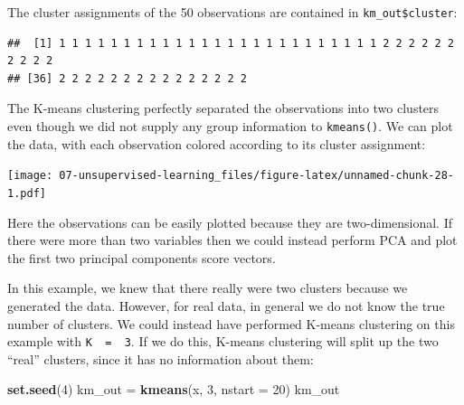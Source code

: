 \documentclass[openany]{book}
\newenvironment{Shaded}{\begin{snugshade}}{\end{snugshade}}
\newcommand{\DataTypeTok}[1]{\textcolor[rgb]{0.13,0.29,0.53}{#1}}
\newcommand{\DecValTok}[1]{\textcolor[rgb]{0.00,0.00,0.81}{#1}}
\newcommand{\KeywordTok}[1]{\textcolor[rgb]{0.13,0.29,0.53}{\textbf{#1}}}
\newcommand{\NormalTok}[1]{#1}
\newcommand{\OperatorTok}[1]{\textcolor[rgb]{0.81,0.36,0.00}{\textbf{#1}}}
\newcommand{\StringTok}[1]{\textcolor[rgb]{0.31,0.60,0.02}{#1}}
\begin{document}
The cluster assignments of the 50 observations are contained in
\texttt{km\_out\$cluster}:

\begin{Shaded}
\end{Shaded}

\begin{verbatim}
##  [1] 1 1 1 1 1 1 1 1 1 1 1 1 1 1 1 1 1 1 1 1 1 1 1 1 1 2 2 2 2 2 2 2 2 2 2
## [36] 2 2 2 2 2 2 2 2 2 2 2 2 2 2 2
\end{verbatim}

The K-means clustering perfectly separated the observations into two clusters
even though we did not supply any group information to \texttt{kmeans()}. We
can plot the data, with each observation colored according to its cluster
assignment:

\begin{Shaded}
\end{Shaded}

\texttt{[image: 07-unsupervised-learning\_files/figure-latex/unnamed-chunk-28-1.pdf]}

Here the observations can be easily plotted because they are two-dimensional.
If there were more than two variables then we could instead perform PCA
and plot the first two principal components score vectors.

In this example, we knew that there really were two clusters because
we generated the data. However, for real data, in general we do not know
the true number of clusters. We could instead have performed K-means
clustering on this example with \texttt{K\ \ =\ \ 3}. If we do this, K-means clustering will split up the two ``real'' clusters, since it has no information about them:

\begin{Shaded}
\begin{Highlighting}[]
\KeywordTok{set.seed}\NormalTok{(}\DecValTok{4}\NormalTok{)}
\NormalTok{km_out =}\StringTok{ }\KeywordTok{kmeans}\NormalTok{(x, }\DecValTok{3}\NormalTok{, }\DataTypeTok{nstart =} \DecValTok{20}\NormalTok{)}
\NormalTok{km_out}
\end{Highlighting}
\end{Shaded}
\end{document}
